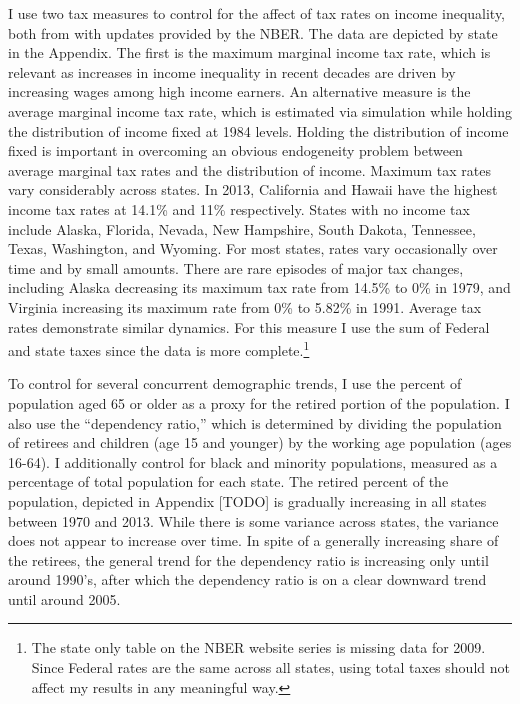 \documentclass[11pt]{article}
\theoremstyle{definition}
\numberwithin{equation}{section}
\begin{document}
I use two tax measures to control for the affect of tax rates on income inequality, both from \cite{feenberg1993taxsim} with updates provided by the NBER. The data are depicted by state in the Appendix. The first is the maximum marginal income tax rate, which is relevant as increases in income inequality in recent decades are driven by increasing wages among high income earners. An alternative measure is the average marginal income tax rate, which is estimated via simulation while holding the distribution of income fixed at 1984 levels. Holding the distribution of income fixed is important in overcoming an obvious endogeneity problem between average marginal tax rates and the distribution of income. Maximum tax rates vary considerably across states. In 2013, California and Hawaii have the highest income tax rates at 14.1\% and 11\% respectively. States with no income tax include Alaska, Florida, Nevada, New Hampshire, South Dakota, Tennessee, Texas, Washington, and Wyoming. For most states, rates vary occasionally over time and by small amounts. There are rare episodes of major tax changes, including Alaska decreasing its maximum tax rate from 14.5\% to 0\% in 1979, and Virginia increasing its maximum rate from 0\% to 5.82\% in 1991. Average tax rates demonstrate similar dynamics. For this measure I use the sum of Federal and state taxes since the data is more complete.\footnote{The state only table on the NBER website series is missing data for 2009. Since Federal rates are the same across all states, using total taxes should not affect my results in any meaningful way. }


To control for several concurrent demographic trends, I use the percent of population aged 65 or older as a proxy for the retired portion of the population. I also use the ``dependency ratio,'' which is determined by dividing the population of retirees and children (age 15 and younger) by the working age population (ages 16-64). I additionally control for black and minority populations, measured as a percentage of total population for each state. The retired percent of the population, depicted in Appendix [TODO] is gradually increasing in all states between 1970 and 2013. While there is some variance across states, the variance does not appear to increase over time. In spite of a generally increasing share of the retirees, the general trend for the dependency ratio is increasing only until around 1990's, after which the dependency ratio is on a clear downward trend until around 2005.
\end{document}
